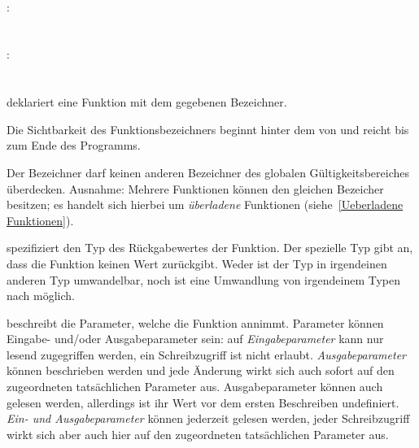\hspace*{1cm}\Gspace{}\Gspace{} \Gspace{} \Gspace\Gt{=}\Gspace{} \Gspace\Gt{,}\Gspace{} \\
:\label{funktion_aufruf}\\
\hspace*{1cm} \Gspace\Gt{(}\Gspace\Gt{)}\\
\hspace*{1cm} \Gspace\Gt{(}\Gspace{} \Gspace\Gt{)}\\
:\label{funktion_param_tatsaechl}\\
\hspace*{1cm} \\
\hspace*{1cm} \Gspace\Gt{,}\Gspace{} \\


 deklariert eine Funktion mit dem gegebenen Bezeichner.

Die Sichtbarkeit des Funktionsbezeichners beginnt hinter dem \Gt{)} von 
und reicht bis zum Ende des Programms.

Der Bezeichner darf keinen anderen Bezeichner des globalen Gültigkeitsbereiches überdecken.
Ausnahme: Mehrere Funktionen können den gleichen Bezeicher besitzen; es handelt sich hierbei
um \emph{überladene} Funktionen (siehe~\ref{Ueberladene Funktionen}).

 spezifiziert den Typ des Rückgabewertes der Funktion. Der spezielle Typ 
gibt an, dass die Funktion keinen Wert zurückgibt.
Weder ist der Typ  in irgendeinen anderen Typ umwandelbar, noch ist eine Umwandlung
von irgendeinem Typen nach  möglich.

 beschreibt die Parameter, welche die Funktion annimmt.
Parameter können Eingabe- und/oder Ausgabeparameter sein: auf \emph{Eingabeparameter} kann
nur lesend zugegriffen werden, ein Schreibzugriff ist nicht erlaubt.
\emph{Ausgabeparameter} können beschrieben werden und jede Änderung wirkt sich auch sofort auf
den zugeordneten tatsächlichen Parameter aus. Ausgabeparameter können auch gelesen werden,
allerdings ist ihr Wert vor dem ersten Beschreiben undefiniert.
\emph{Ein- und Ausgabeparameter} können jederzeit gelesen werden, jeder Schreibzugriff wirkt sich
aber auch hier auf den zugeordneten tatsächlichen Parameter aus.


